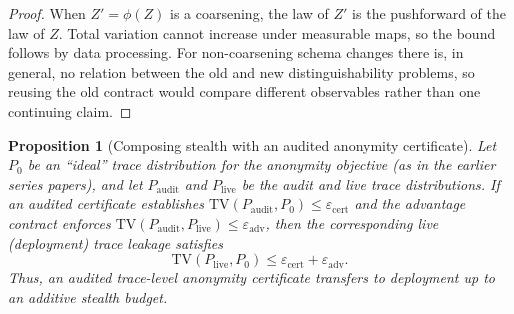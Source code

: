 \documentclass[11pt]{article}
\newtheorem{proposition}{Proposition}
\newcommand{\TV}{\mathrm{TV}}
\begin{document}
\begin{proof}
When $Z'=\phi(Z)$ is a coarsening, the law of $Z'$ is the pushforward of the law of $Z$.
Total variation cannot increase under measurable maps, so the bound follows by data processing.
For non-coarsening schema changes there is, in general, no relation between the old and new distinguishability problems, so reusing the old contract would compare different observables rather than one continuing claim.
\end{proof}

\begin{proposition}[Composing stealth with an audited anonymity certificate]\label{prop:compose}
Let $P_0$ be an ``ideal'' trace distribution for the anonymity objective (as in the earlier series papers), and let $P_{\mathrm{audit}}$ and $P_{\mathrm{live}}$ be the audit and live trace distributions.
If an audited certificate establishes $\TV(P_{\mathrm{audit}},P_0)\le \varepsilon_{\mathrm{cert}}$ and the advantage contract enforces $\TV(P_{\mathrm{audit}},P_{\mathrm{live}})\le \varepsilon_{\mathrm{adv}}$,
then the corresponding live (deployment) trace leakage satisfies
\[
\TV(P_{\mathrm{live}},P_0) \le \varepsilon_{\mathrm{cert}}+\varepsilon_{\mathrm{adv}}.
\]
Thus, an audited trace-level anonymity certificate transfers to deployment up to an additive stealth budget.
\end{proposition}
\end{document}
